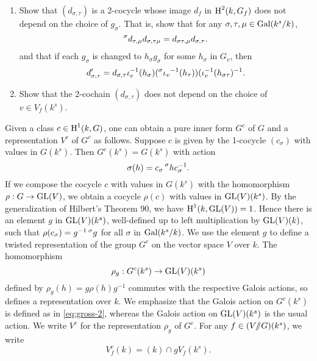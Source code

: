 \begin{exercise}
\begin{enumerate}
  \item Show that $(d_{\sigma,\tau})$ is a 2-cocycle whose image $d_f$ in 
    $\operatorname{H}^2(k,G_f)$ does not depend on the choice of $g_\sigma$. That is, show 
    that for any $\sigma,\tau,\mu\in \operatorname{Gal}(k^s/k)$, 
    \[
      \prescript{\sigma}{}{d_{\tau,\mu}} d_{\sigma,\tau\mu} = d_{\sigma\tau,\mu} d_{\sigma,\tau} .
    \]
    and that if each $g_\sigma$ is changed to $h_\sigma g_\sigma$ for some 
    $h_\sigma$ in $G_v$, then 
    \[
      d_{\sigma,\tau}' = d_{\sigma,\tau} \iota_v^{-1} (h_\sigma) (\prescript{\sigma}{}{\iota_v}^{-1}(h_\tau)) (\iota_v^{-1}(h_{\sigma\tau})^{-1} .
    \]
  \item Show that the 2-cochain $(d_{\sigma,\tau})$ does not depend on the 
    choice of $v\in V_f(k^s)$. 
\end{enumerate}
\end{exercise}

Given a class $c\in \operatorname{H}^1(k,G)$, one can obtain a pure inner form $G^c$ of $G$ 
and a representation $V^c$ of $G^c$ as follows. Suppose $c$ is given by the 
1-cocycle $(c_\sigma)$ with values in $G(k^s)$. Then $G^c(k^s) = G(k^s)$ with 
action 
\begin{equation}\label{eq:gross-2}
  \sigma(h) = c_\sigma \prescript{\sigma}{}{h} c_\sigma^{-1} .
\end{equation}
If we compose the cocycle $c$ with values in $G(k^s)$ with the homomorphism 
$\rho:G\to \operatorname{GL}(V)$, we obtain a cocycle $\rho(c)$ with values in 
$\operatorname{GL}(V)(k^s)$. By the generalization of Hilbert's Theorem 90, we 
have $\operatorname{H}^1(k,\operatorname{GL}(V))=1$. Hence there is an element $g$ in 
$\operatorname{GL}(V)(k^s)$, well-defined up to left multiplication by 
$\operatorname{GL}(V)(k)$, such that 
$\rho(c_\sigma)=g^{-1}\prescript{\sigma}{}{g}$ for all $\sigma$ in 
$\operatorname{Gal}(k^s/k)$. We use the element $g$ to define a twisted representation of 
the group $G^c$ on the vector space $V$ over $k$. The homomorphism 
\[
  \rho_g:G^c(k^s) \to \operatorname{GL}(V)(k^s) 
\]
defined by $\rho_g(h)=g \rho(h) g^{-1}$ commutes with the respective Galois 
actions, so defines a representation over $k$. We emphasize that the Galois 
action on $G^c(k^s)$ is defined as in \eqref{eq:gross-2}, whereas the Galois 
action on $\operatorname{GL}(V)(k^s)$ is the usual action. We write $V^c$ for the 
representation $\rho_g$ of $G^c$. For any $f\in (V/\!\!/ G)(k^s)$, we write 
\[
  V_f^c(k) = (k)\cap g V_f(k^s) .
\]

